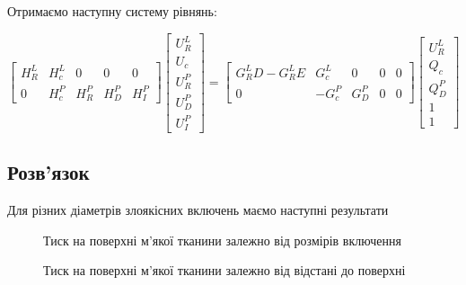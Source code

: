Отримаємо наступну систему рівнянь:

\begin{equation*}
    \begin{bmatrix}
        H_R^L & H_c^L & 0 & 0 & 0 \\ 
        0 & H_c^P & H_R^P & H_D^P & H_I^P
    \end{bmatrix}
    \begin{bmatrix}
        U_R^L \\ 
        U_c \\
        U_R^P \\ 
        U_D^P \\ 
        U_I^P  
    \end{bmatrix} 
    = 
    \begin{bmatrix}
        G_R^LD-G_R^LE & G_c^L & 0 & 0 & 0\\ 
        0 & -G_c^P & G_D^P & 0 & 0
    \end{bmatrix}
    \begin{bmatrix}
        U_R^L \\
        Q_c \\
        Q_D^P \\
        1 \\
        1  
    \end{bmatrix} 
\end{equation*}



\subsection{Розв'язок}

Для різних діаметрів злоякісних включень маємо наступні результати

\begin{figure}[ht!]
    \centering
    \caption{Тиск на поверхні м'якої тканини залежно від розмірів включення}
    \label{fig:elasticity_3d_solution_border_pressure_size}
\end{figure}

\begin{figure}[ht!]
    \centering
    \caption{Тиск на поверхні м'якої тканини залежно від відстані до поверхні}
    \label{fig:elasticity_2d_solution_border_pressure_depth}
\end{figure}

